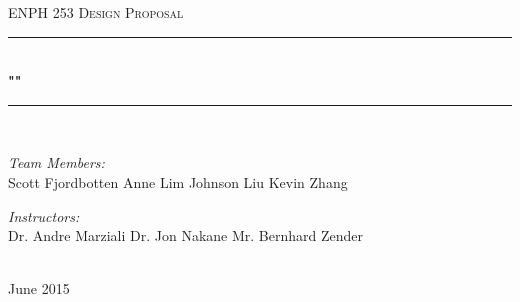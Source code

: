 \documentclass[11pt, oneside]{article} %
\title{\ttitle} %
\begin{document}

\newcommand{\HRule}{\rule{\linewidth}{0.5mm}} %



\begin{titlepage}
\begin{center}

\textsc{\LARGE ENPH 253 Design Proposal}\\[1.5cm]

\HRule \\[0.4cm] %
{\huge \bfseries ""}\\[0.4cm] %
\HRule \\[1.5cm] %
 
\begin{minipage}{0.4\textwidth}
\begin{flushleft} \large
\emph{Team Members:}\\
{Scott Fjordbotten \newline Anne Lim \newline Johnson Liu \newline Kevin Zhang} %
\end{flushleft}
\end{minipage}
\begin{minipage}{0.4\textwidth}
\begin{flushright} \large
\emph{Instructors:} \\
{Dr. Andre Marziali \newline Dr. Jon Nakane \newline Mr. Bernhard Zender} %
\end{flushright}
\end{minipage}\\[3cm]
 
 
{\large June 2015}\\[4cm] %
 
\vfill
\end{center}

\end{titlepage}



\end{document}

